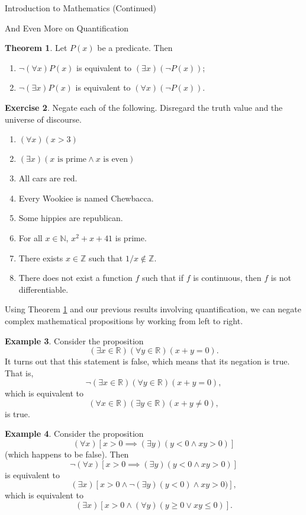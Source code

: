 \documentclass[11pt]{article}
\theoremstyle{definition}
\newtheorem{theorem}{Theorem}[section]
\newtheorem{example}[theorem]{Example}
\newtheorem{exercise}[theorem]{Exercise}
\begin{document}
\begin{section}{Introduction to Mathematics (Continued)}
\begin{subsection}{And Even More on Quantification}
\begin{theorem}\label{thm:negation of quantifiers}
Let $P(x)$ be a predicate.  Then
\begin{enumerate}
\item[1.] $\neg (\forall x)P(x)$ is equivalent to $(\exists x)(\neg P(x))$;
\item[2.] $\neg (\exists x)P(x)$ is equivalent to $(\forall x)(\neg P(x))$.
\end{enumerate}
\end{theorem}

\begin{exercise}
Negate each of the following.  Disregard the truth value and the universe of discourse.
\begin{enumerate}
\item $(\forall x)(x>3)$
\item $(\exists x)(x \mbox{ is prime}\wedge x \mbox{ is even})$
\item All cars are red.
\item Every Wookiee is named Chewbacca.
\item Some hippies are republican.
\item For all $x\in\mathbb{N}$, $x^2+x+41$ is prime.
\item There exists $x\in\mathbb{Z}$ such that $1/x\notin\mathbb{Z}$.
\item There does not exist a function $f$ such that if $f$ is continuous, then $f$ is not differentiable.
\end{enumerate}
\end{exercise}

Using Theorem \ref{thm:negation of quantifiers} and our previous results involving quantification, we can negate complex mathematical propositions by working from left to right.

\begin{example}
Consider the proposition
\[
(\exists x\in\mathbb{R})(\forall y\in\mathbb{R})(x+y=0).
\]
It turns out that this statement is false, which means that its negation is true.  That is,
\[
\neg(\exists x\in\mathbb{R})(\forall y\in\mathbb{R})(x+y=0),
\]
which is equivalent to
\[
(\forall x\in\mathbb{R})(\exists y\in\mathbb{R})(x+y\neq 0),
\]
is true.
\end{example}

\begin{example}
Consider the proposition
\[
(\forall x)[x>0\implies (\exists y)(y<0 \wedge xy>0)]
\]
(which happens to be false).  Then
\[
\neg (\forall x)[x>0\implies (\exists y)(y<0 \wedge xy>0)]
\]
is equivalent to
\[
(\exists x)[x>0 \wedge \neg (\exists y)(y<0) \wedge xy>0)],
\]
which is equivalent to 
\[
(\exists x)[x>0 \wedge (\forall y)(y\geq 0 \vee xy\leq 0)].
\]
\end{example}


\end{subsection}
\end{section}
\end{document}
